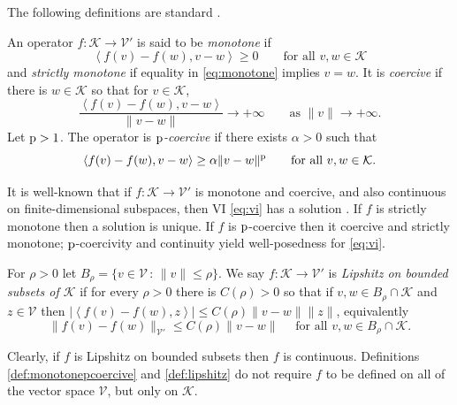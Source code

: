 \documentclass[hidelinks,onefignum,onetabnum,final]{siamart220329}  %
\newcommand{\cK}{\mathcal{K}}
\newcommand{\cV}{\mathcal{V}}
\newcommand{\pp}{{\text{\textnormal{p}}}}
\newcommand{\ip}[2]{\left<#1,#2\right>}
\begin{document}
The following definitions are standard \cite[Chapter III]{KinderlehrerStampacchia1980}.

\begin{definition} \label{def:monotonepcoercive}
An operator $f:\cK \to \cV'$ is said to be \emph{monotone} if
\begin{equation}
\ip{f(v)-f(w)}{v-w} \ge 0 \qquad \text{for all } v,w \in \cK \label{eq:monotone}
\end{equation}
and \emph{strictly monotone} if equality in \eqref{eq:monotone} implies $v=w$.  It is \emph{coercive} if there is $w\in \cK$ so that for $v \in \cK$,
\begin{equation}
\frac{\ip{f(v)-f(w)}{v-w}}{\|v-w\|} \to +\infty \qquad \text{as } \|v\| \to +\infty. \label{eq:coercive}
\end{equation}
Let $\pp>1$.  The operator is \emph{$\pp$-coercive \cite{Bueler2021conservation}} if there exists $\alpha>0$ such that
\begin{equation}
\ip{f(v)-f(w)}{v-w} \ge \alpha \|v-w\|^\pp \qquad \text{for all } v,w \in \cK. \label{eq:pcoercive}
\end{equation}
\end{definition}

It is well-known that if $f:\cK \to \cV'$ is monotone and coercive, and also continuous on finite-dimensional subspaces, then VI \eqref{eq:vi} has a solution \cite[Corollary III.1.8]{KinderlehrerStampacchia1980}.  If $f$ is strictly monotone then a solution is unique.  If $f$ is $\pp$-coercive then it coercive and strictly monotone; $\pp$-coercivity and continuity yield well-posedness for \eqref{eq:vi}.

\begin{definition} \label{def:lipshitz}
For $\rho>0$ let $B_\rho = \{v\in \cV\,:\,\|v\|\le \rho\}$.  We say $f:\cK \to \cV'$ is \emph{Lipshitz on bounded subsets of $\cK$} if for every $\rho>0$ there is $C(\rho)>0$ so that if $v,w \in B_\rho \cap \cK$ and $z\in\cV$ then $|\ip{f(v)-f(w)}{z}| \le C(\rho) \|v-w\| \|z\|$, equivalently
\begin{equation}
\|f(v)-f(w)\|_{\cV'} \le C(\rho) \|v-w\| \quad \text{ for all } v,w \in B_\rho \cap \cK.  \label{eq:liponbounded}
\end{equation}
\end{definition}

Clearly, if $f$ is Lipshitz on bounded subsets then $f$ is continuous.  Definitions \ref{def:monotonepcoercive} and \ref{def:lipshitz} do not require $f$ to be defined on all of the vector space $\cV$, but only on $\cK$.
\end{document}
